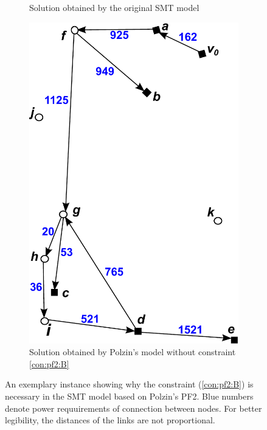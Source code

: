 \begin{figure}
\begin{subfigure}[b]{0.4\textwidth}
        \caption{Solution obtained by the original SMT model }
        \label{fig:BorigSMT}
    \end{subfigure}
    \hfill %
    \begin{subfigure}[b]{0.4\textwidth}
        \includegraphics[width=\textwidth]{conBNec2}
        \caption{Solution obtained by Polzin's model without constraint \ref{con:pf2:B}}
        \label{fig:Bpf2}
    \end{subfigure}
    \caption{An exemplary instance showing why the constraint (\ref{con:pf2:B}) is necessary in the SMT model based on Polzin's PF2. Blue numbers denote power requuirements of connection between nodes. For better legibility, the distances of the links are not proportional.}\label{fig:BProof}
\end{figure}    
    
